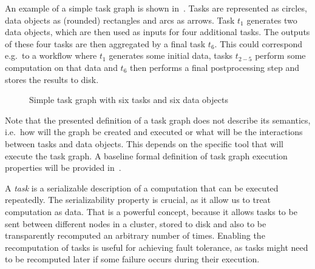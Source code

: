 An example of a simple task graph is shown in~. Tasks are represented as
circles, data objects as (rounded) rectangles and arcs as arrows. Task $t_1$
generates two data objects, which are then used as inputs for four additional tasks. The outputs of
these four tasks are then aggregated by a final task $t_6$. This could correspond
e.g.\ to a workflow where $t_1$ generates some initial data, tasks
$t_{2-5}$ perform some computation on that data and $t_6$ then
performs a final postprocessing step and stores the results to disk.

\begin{figure}[h]
	\centering
	\caption{Simple task graph with six tasks and six data objects}
	\label{fig:task-graph-example}
\end{figure}

Note that the presented definition of a task graph does not describe its semantics, i.e.\ how will
the graph be created and executed or what will be the interactions between tasks and data objects.
This depends on the specific tool that will execute the task graph. A baseline formal definition of
task graph execution properties will be provided in~.

A \emph{task} is a serializable description of a computation that can be executed
repeatedly. The serializability property is crucial, as it allow us to treat computation as data.
That is a powerful concept, because it allows tasks to be sent between different nodes in a
cluster, stored to disk and also to be transparently recomputed an arbitrary number of times.
Enabling the recomputation of tasks is useful for achieving fault tolerance, as tasks might need to
be recomputed later if some failure occurs during their execution.

